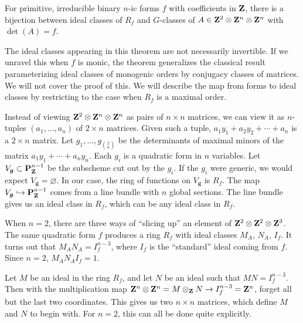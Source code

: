 \begin{theo}
For primitive, irreducible binary $n$-ic forms $f$ with coefficients in 
$\mathbf{Z}$, there is a bijection between ideal classes of $R_f$ and 
$G$-classes of $A\in \mathbf{Z}^2\otimes \mathbf{Z}^n\otimes \mathbf{Z}^n$ with $\det(A)=f$. 
\end{theo}

The ideal classes appearing in this theorem are not necessarily invertible. 
If we unravel this when $f$ is monic, the theorem generalizes the classical 
result parameterizing ideal classes of monogenic orders by conjugacy classes 
of matrices. We will not cover the proof of this. We will describe the 
map from forms to ideal classes by restricting to the case when $R_f$ is a 
maximal order. 

Instead of viewing $\mathbf{Z}^2\otimes \mathbf{Z}^n\otimes \mathbf{Z}^n$ as pairs of 
$n\times n$ matrices, we can view it as $n$-tuples $(a_1,\dots,a_n)$ of 
$2\times n$ matrices. Given such a tuple, 
$a_1 y_1 + a_2 y_2 + \cdots + a_n$ is a $2\times n$ matrix. Let 
$g_1,\dots,g_{\binom 2 n}$ be the determinants of maximal minors of the matrix 
$a_1 y_1 + \cdots + a_n y_n$. Each $g_i$ is a quadratic form in $n$ variables. 
Let $V_{\boldsymbol g}\subset \mathbf{P}_{\mathbf{Z}}^{n-1}$ be the subscheme cut out by the 
$g_i$. If the $g_i$ were generic, we would expect 
$V_{\boldsymbol g} = \varnothing$. In our case, the ring of functions on 
$V_{\boldsymbol g}$ is $R_f$. The map 
$V_{\boldsymbol g}\hookrightarrow \mathbf{P}_{\mathbf{Z}}^{n-1}$ comes from a line bundle with 
$n$ global sections. The line bundle gives us an ideal class in $R_f$, which 
can be any ideal class in $R_f$. 

When $n=2$, there are three ways of ``slicing up'' an element of 
$\mathbf{Z}^2\otimes \mathbf{Z}^2\otimes \mathbf{Z}^3$. The same quadratic form $f$ produces a ring 
$R_f$ with ideal classes $M_A$, $N_A$, $I_f$. It turns out that 
$M_A N_A = I_f^{n-3}$, where $I_f$ is the ``standard'' ideal coming from $f$. 
Since $n=2$, $M_A N_A I_f = 1$. 

Let $M$ be an ideal in the ring $R_f$, and let $N$ be an ideal such that 
$M N=I_f^{n-3}$. Then with the multiplication map 
$\mathbf{Z}^n\otimes \mathbf{Z}^n = M\otimes_{\mathbf{Z}} N \to I_f^{n-3} = \mathbf{Z}^n$, forget all but the 
last two coordinates. This gives us two $n\times n$ matrices, which define 
$M$ and $N$ to begin with. For $n=2$, this can all be done quite explicitly. 




